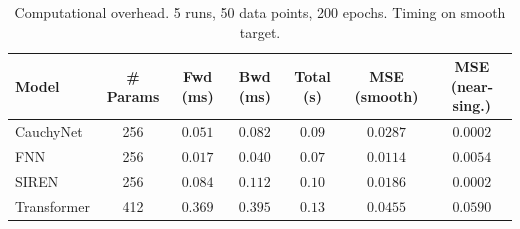 \begin{table}[ht]\centering
\caption{Computational overhead. 5 runs, 50 data points, 200 epochs. Timing on smooth target.}
\label{tab:overhead}
\begin{tabular}{lcccccc}
\toprule
Model & \# Params & Fwd (ms) & Bwd (ms) & Total (s) & MSE (smooth) & MSE (near-sing.) \\
\midrule
CauchyNet & 256 & $0.051$ & $0.082$ & $0.09$ & $0.0287$ & $0.0002$ \\
FNN & 256 & $0.017$ & $0.040$ & $0.07$ & $0.0114$ & $0.0054$ \\
SIREN & 256 & $0.084$ & $0.112$ & $0.10$ & $0.0186$ & $0.0002$ \\
Transformer & 412 & $0.369$ & $0.395$ & $0.13$ & $0.0455$ & $0.0590$ \\
\bottomrule
\end{tabular}
\end{table}